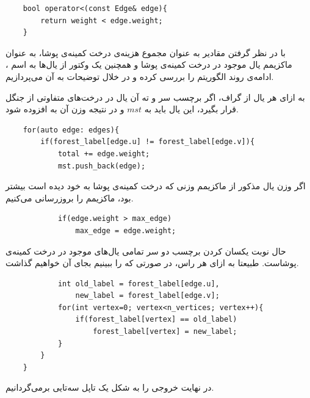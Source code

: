 \documentclass{article}
\begin{document}
\begin{latin}
\begin{verbatim}
    bool operator<(const Edge& edge){
        return weight < edge.weight;
    }
\end{verbatim}
\end{latin}

با در نظر گرفتن مقادیر
به عنوان مجموع هزینه‌ی درخت کمینه‌ی پوشا،
به عنوان ماکزیمم یال موجود در درخت کمینه‌ی پوشا و همچنین یک وکتور از یال‌ها به اسم
،
ادامه‌ی روند الگوریتم را بررسی کرده و در خلال توضیحات به آن می‌پردازیم.

به ازای هر یال از گراف، اگر برچسب سر و ته آن یال در درخت‌های متفاوتی از جنگل قرار بگیرد، این یال باید به
$mst$
و در نتیجه وزن آن به
افزوده شود.

\begin{latin}
\begin{verbatim}
    for(auto edge: edges){
        if(forest_label[edge.u] != forest_label[edge.v]){
            total += edge.weight;
            mst.push_back(edge);
\end{verbatim}
\end{latin}

اگر وزن یال مذکور از ماکزیمم وزنی که درخت کمینه‌ی پوشا به خود دیده است بیشتر بود، ماکزیمم را بروزرسانی می‌کنیم.

\begin{latin}
\begin{verbatim}
            if(edge.weight > max_edge)
                max_edge = edge.weight;
\end{verbatim}
\end{latin}

حال نوبت یکسان کردن برچسب دو سر تمامی یال‌های موجود در درخت کمینه‌ی پوشاست. طبیعتا به ازای هر راس، در صورتی که
را ببینیم بجای آن
خواهیم گذاشت.

\begin{latin}
\begin{verbatim}
            int old_label = forest_label[edge.u],
                new_label = forest_label[edge.v];
            for(int vertex=0; vertex<n_vertices; vertex++){
                if(forest_label[vertex] == old_label)
                    forest_label[vertex] = new_label;
            }
        }
    }
\end{verbatim}
\end{latin}

در نهایت خروجی را به شکل یک تاپل سه‌تایی
برمی‌گردانیم.
\end{document}
